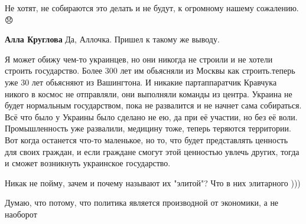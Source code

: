 \begin{itemize}
 
Не хотят, не собираются это делать и не будут, к огромному нашему сожалению. 😞

\begin{itemize}
 
\textbf{Алла Круглова} Да, Аллочка. Пришел к такому же выводу.
\end{itemize}


Я может обижу чем-то украинцев, но они никогда не строили и не хотели строить
государство. Более 300 лет им обьясняли из Москвы как строить.теперь уже 30 лет
обьясняют из Вашингтона. И никакие партаппаратчик Кравчука никого в космос не
отправляли, они выполняли команды из центра. Украина не будет нормальным
государством, пока не развалится и не начнет сама собираться. Всё что было у
Украины было сделано не ею, да при её участии, но без её воли. Промышленность
уже развалили, медицину тоже, теперь теряются территории. Вот когда останется
что-то маленькое, но то, что будет представлять ценность для своих граждан, и
если граждане смогут этой ценностью увлечь других, тогда и сможет возникнуть
украинское государство.

 
Никак не пойму, зачем и почему называют их "элитой"? Что в них элитарного )))


Думаю, что потому, что политика является производной от экономики, а не наоборот



\end{itemize}
